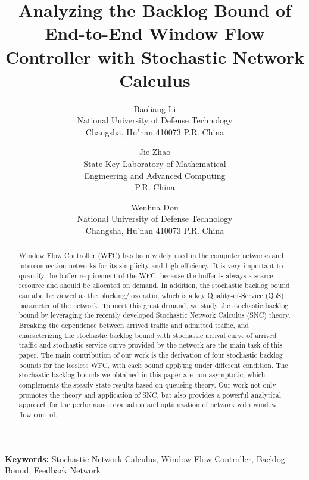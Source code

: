 \documentclass[12pt]{article}
\title{Analyzing the Backlog Bound of End-to-End Window Flow Controller with Stochastic Network Calculus}
\author{Baoliang Li \\
National University of Defense Technology \\
Changsha, Hu'nan 410073 P.R. China
\and
Jie Zhao\\
State Key Laboratory of Mathematical \\
Engineering and Advanced Computing\\
P.R. China
\and
Wenhua Dou \\
National University of Defense Technology \\
Changsha, Hu'nan 410073 P.R. China
}
\begin{document}
\maketitle
\begin{abstract}
Window Flow Controller (WFC) has been widely used in the computer networks and interconnection networks for its simplicity and high efficiency. It is very important to quantify the buffer requirement of the WFC, because the buffer is always a scarce resource and should be allocated on demand. In addition, the stochastic backlog bound can also be viewed as the blocking/loss ratio, which is a key Quality-of-Service (QoS) parameter of the network. To meet this great demand, we study the stochastic backlog bound by leveraging the recently developed Stochastic Network Calculus (SNC) theory. Breaking the dependence between arrived traffic and admitted traffic, and characterizing the stochastic backlog bound with stochastic arrival curve of arrived traffic and stochastic service curve provided by the network are the main task of this paper. The main contribution of our work is the derivation of four stochastic backlog bounds for the lossless WFC, with each bound applying under different condition. The stochastic backlog bounds we obtained in this paper are non-asymptotic, which complements the steady-state results based on queueing theory. Our work not only promotes the theory and application of SNC, but also provides a powerful analytical approach for the performance evaluation and optimization of network with window flow control.
\end{abstract}

{\bf Keywords:} Stochastic Network Calculus, Window Flow Controller, Backlog Bound, Feedback Network
\end{document}
